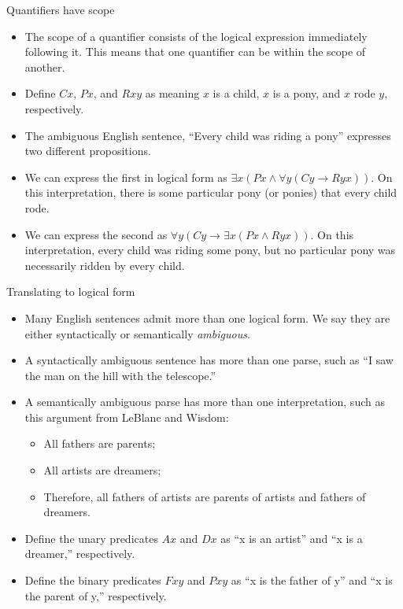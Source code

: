 \documentclass[
  ignorenonframetext,
]{beamer}
\providecommand{\tightlist}{%
  \setlength{\itemsep}{0pt}\setlength{\parskip}{0pt}}
\begin{document}
\begin{frame}{Quantifiers have scope}
\protect\hypertarget{quantifiers-have-scope}{}

\begin{itemize}[<+->]
\tightlist
\item
  The scope of a quantifier consists of the logical expression
  immediately following it. This means that one quantifier can be within
  the scope of another.
\item
  Define \(Cx\), \(Px\), and \(Rxy\) as meaning \(x\) is a child, \(x\)
  is a pony, and \(x\) rode \(y\), respectively.
\item
  The ambiguous English sentence, ``Every child was riding a pony''
  expresses two different propositions.
\item
  We can express the first in logical form as
  \({\exists}x (Px \wedge {\forall}y (Cy \rightarrow Ryx))\). On this
  interpretation, there is some particular pony (or ponies) that every
  child rode.
\item
  We can express the second as
  \({\forall}y (Cy \rightarrow {\exists}x (Px \wedge Ryx))\). On this
  interpretation, every child was riding some pony, but no particular
  pony was necessarily ridden by every child.
\end{itemize}

\end{frame}

\begin{frame}[fragile]{Translating to logical form}
\protect\hypertarget{translating-to-logical-form}{}

\begin{itemize}[<+->]
\item
  Many English sentences admit more than one logical form. We say they
  are either syntactically or semantically \emph{ambiguous}.
\item
  A syntactically ambiguous sentence has more than one parse, such as
  ``I saw the  man on the hill with the telescope.''
\item
  A semantically ambiguous parse has more than one interpretation,
  such as this argument from LeBlanc and Wisdom:
\begin{itemize}
 \item All fathers are parents;
 \item All artists are dreamers;
 \item Therefore, all fathers of artists are parents of artists and
   fathers of dreamers.
\end{itemize}
\item
  Define the unary predicates \(Ax\) and \(Dx\) as ``x is an artist''
  and ``x is a dreamer,'' respectively.
\item
  Define the binary predicates \(Fxy\) and \(Pxy\) as ``x is the father
  of y'' and ``x is the parent of y,'' respectively.
\end{itemize}

\end{frame}
\end{document}
